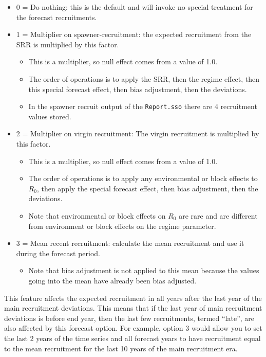 \begin{itemize}
	\item 0 = Do nothing: this is the default and will invoke no special treatment for the forecast recruitments.
	\item 1 = Multiplier on spawner-recruitment: the expected recruitment from the SRR is multiplied by this factor.
	\begin{itemize}
		\item This is a multiplier, so null effect comes from a value of 1.0.
		\item The order of operations is to apply the SRR, then the regime effect, then this special forecast effect, then bias adjustment, then the deviations.
		\item In the spawner recruit output of the \texttt{Report.sso} there are 4 recruitment values stored.
	\end{itemize}
	\item 2 = Multiplier on virgin recruitment: The virgin recruitment is multiplied by this factor.
	\begin{itemize}
		\item This is a multiplier, so null effect comes from a value of 1.0.
		\item The order of operations is to apply any environmental or block effects to $R_{0}$, then apply the special forecast effect, then bias adjustment, then the deviations.
		\item Note that environmental or block effects on $R_{0}$ are rare and are different from environment or block effects on the regime parameter.
	\end{itemize}
	\item 3 = Mean recent recruitment: calculate the mean recruitment and use it during the forecast period.
	\begin{itemize}
		\item Note that bias adjustment is not applied to this mean because the values going into the mean have already been bias adjusted.
	\end{itemize}
\end{itemize}

This feature affects the expected recruitment in all years after the last year of the main recruitment deviations. This means that if the last year of main recruitment deviations is before end year, then the last few recruitments, termed ``late'', are also affected by this forecast option. For example, option 3 would allow you to set the last 2 years of the time series and all forecast years to have recruitment equal to the mean recruitment for the last 10 years of the main recruitment era.

\pagebreak
